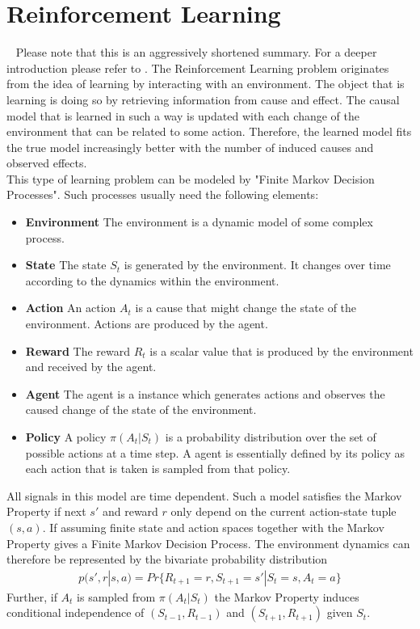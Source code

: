 \section{Reinforcement Learning}~\label{ssec:rl}
Please note that this is an aggressively shortened summary. For a deeper introduction please refer to \cite{SB_all}.
The Reinforcement Learning problem originates from the idea of learning by interacting with an environment. The object that is learning is doing so by retrieving information from cause and effect. The causal model that is learned in such a way is updated with each change of the environment that can be related to some action. Therefore, the learned model fits the true model increasingly better with the number of induced causes and observed effects.\\
This type of learning problem can be modeled by "Finite Markov Decision Processes". Such processes usually need the following elements:\\

\begin{itemize}
	\item \textbf{Environment} The environment is a dynamic model of some complex process.
	\item \textbf{State} The state $S_t$ is generated by the environment. It changes over time according to the dynamics within the environment.
	\item \textbf{Action} An action $A_t$ is a cause that might change the state of the environment. Actions are produced by the agent.
	\item \textbf{Reward} The reward $R_t$ is a scalar value that is produced by the environment and received by the agent.
	\item \textbf{Agent} The agent is a instance which generates actions and observes the caused change of the state of the environment.
	\item \textbf{Policy} A policy $\pi(A_t|S_t)$ is a probability distribution over the set of possible actions at a time step. A agent is essentially defined by its policy as each action that is taken is sampled from that policy.
\end{itemize}

\noindent All signals in this model are time dependent. 
Such a model satisfies the Markov Property if next $s'$ and reward $r$ only depend on the current action-state tuple $(s, a)$. If assuming finite state and action spaces together with the Markov Property gives a Finite Markov Decision Process. The environment dynamics can therefore be represented by the bivariate probability distribution
\begin{align}
	p(s', r|s, a) = Pr\{R_{t+1}=r, S_{t+1} = s' | S_t=s, A_t=a\}
\end{align}
Further, if $A_t$ is sampled from $\pi(A_t|S_t)$ the Markov Property induces conditional independence of $(S_{t-1}, R_{t-1})$ and $(S_{t+1}, R_{t+1})$ given $S_t$. \\

